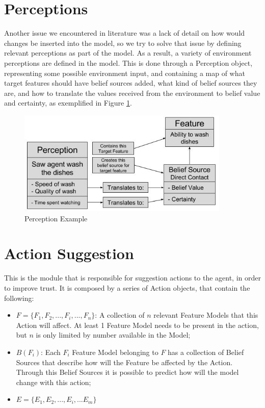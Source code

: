 \section{Perceptions}
Another issue we encountered in literature was a lack of detail on how would changes be inserted into the model, so we try to solve that issue by defining relevant perceptions as part of the model. As a result, a variety of environment perceptions are defined in the model. This is done through a Perception object, representing some possible environment input, and containing a map of what target features should have belief sources added, what kind of belief sources they are, and how to translate the values received from the environment to belief value and certainty, as exemplified in Figure \ref{fig:Perceptions Diagram}.

\begin{figure}[hbt]
    \centering
    \includegraphics[width=0.9\textwidth]{figures/PerceptionsDiagram.jpg}
    \caption{Perception Example}
    \label{fig:Perceptions Diagram}
\end{figure}

\section{Action Suggestion}
This is the module that is responsible for suggestion actions to the agent, in order to improve trust. It is composed by a series of Action objects, that contain the following:
\begin{itemize}
    \item $F = \{F_1, F_2, ..., F_i, ..., F_n\}$: A collection of $n$ relevant Feature Models that this Action will affect. At least 1 Feature Model needs to be present in the action, but $n$ is only limited by number available in the Model;
    \item $B(F_i)$: Each $F_i$ Feature Model belonging to $F$ has a collection of Belief Sources that describe how will the Feature be affected by the Action. Through this Belief Sources it is possible to predict how will the model change with this action;
    \item $E = \{E_1, E_2, ..., E_i, ... E_m\}$ 
\end{itemize}

